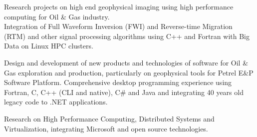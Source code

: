 \documentclass[11pt, a4paper, sans]{moderncv} %
\begin{document}
{}


{
Research projects on high end geophysical imaging using high performance computing for Oil \& Gas industry.\\
Integration of Full Waveform Inversion (FWI) and Reverse-time Migration (RTM) and other signal processing algorithms using C++ and Fortran with Big Data on Linux HPC clusters.
}




{
Design and development of new products and technologies of software for Oil \& Gas exploration and production, particularly on geophysical tools for Petrel E\&P Software Platform. 
Comprehensive desktop programming experience using Fortran, C, C++ (CLI and native), C\# and Java and integrating 40 years old legacy code to .NET applications.
}


{
Research on High Performance Computing, Distributed Systems and Virtualization, integrating Microsoft and open source technologies.
}






\end{document}
